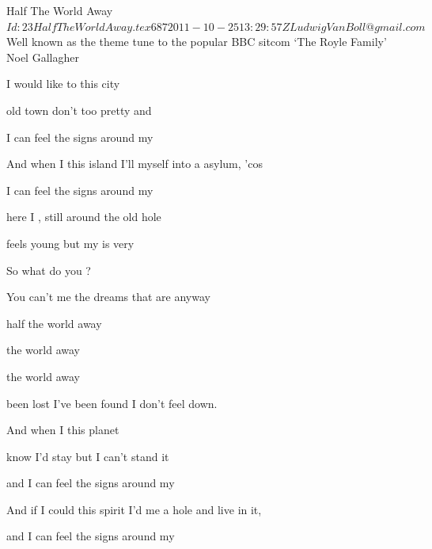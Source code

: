 \begin{SBSong}{Half The World Away}
  {$Id: 23HalfTheWorldAway.tex 687 2011-10-25 13:29:57Z LudwigVanBoll@gmail.com $}
  {Well known as the theme tune to the popular BBC sitcom `The Royle Family'}
  {Noel Gallagher}
  \begin{SBVerse}
     I would like to  this city
    
     old town don't  too pretty and 
    
     I can feel the  signs  around my  
    
     And when I  this island I'll  myself into a  asylum, 'cos
    
     I can feel the  signs  around my  
  \end{SBVerse}
  \begin{SBChorus}
     here I , still  around the  old hole 
    
     feels young but my  is very  
    
     So what do you ? 
    
    You can't  me the dreams that are  anyway 
    
     half the world away 
    
     the world away 
    
     the world away 
    
     been lost I've been found  I don't feel down.  
  \end{SBChorus}
  \begin{SBVerse}
     And when I  this planet
    
     know I'd stay but I  can't stand it 
    
     and I can feel the  signs  around my 
    
     And if I could  this spirit I'd  me a hole and  live in it,
    
    and  I can feel the  signs  around my 
  \end{SBVerse}
\end{SBSong}